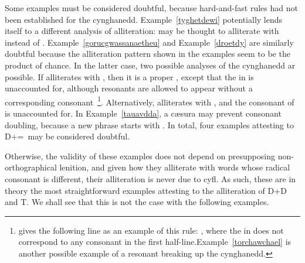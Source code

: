 Some examples must be considered doubtful, because hard-and-fast rules had not been established for the cynghanedd. Example~\ref{tyghetdewi} potentially lends itself to a different analysis of alliteration:  may be thought to alliterate with  instead of . Example~\ref{gorucgwassanaetheu} and Example~\ref{droetdy} are similarly doubtful because the alliteration pattern shown in the examples seem to be the product of chance. In the latter case, two possible analyses of the cynghanedd ar possible. If  alliterates with , then it is a proper , except that the  in  is unaccounted for, although resonants are allowed to appear without a corresponding consonant~\autocite[203--07]{jones_meddwl_2005}\footnote{\Textcite[203--07]{jones_meddwl_2005} gives the following line as an example of this rule: , where the  in  does not correspond to any consonant in the first half-line.Example~\ref{torchawchael} is another possible example of a resonant breaking up the cynghanedd.}. Alternatively,   alliterates with , and the consonant of  is unaccounted for. In Example~\ref{tauavdda}, a cæsura may prevent consonant doubling, because a new phrase starts with . In total, four examples attesting to \gls{D}+\xD=\xT\ may be considered doubtful.

Otherwise, the validity of these examples does not depend on presupposing non-orthographical lenition, and given how they alliterate with words whose radical consonant is different, their alliteration is never due to \gls{cyfl}. As such, these are in theory the most straightforward examples attesting to the alliteration of \gls{D}+\gls{D} and \gls{T}.  We shall see that this is not the case with the following examples.


